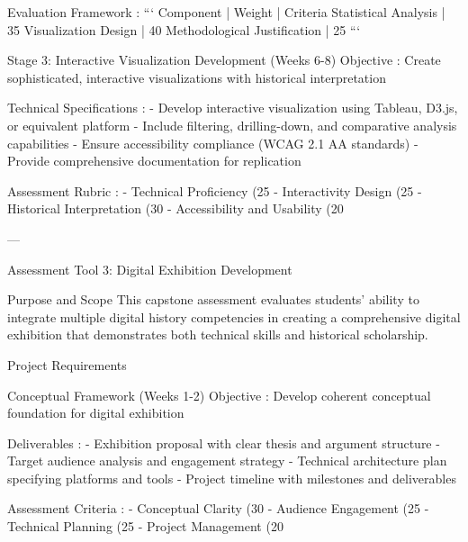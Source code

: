 \begin{appendices}
 Evaluation Framework :
```
Component | Weight | Criteria
Statistical Analysis | 35%
Visualization Design | 40%
Methodological Justification | 25%
```

     Stage 3: Interactive Visualization Development (Weeks 6-8)
 Objective : Create sophisticated, interactive visualizations with historical interpretation

 Technical Specifications :
- Develop interactive visualization using Tableau, D3.js, or equivalent platform
- Include filtering, drilling-down, and comparative analysis capabilities
- Ensure accessibility compliance (WCAG 2.1 AA standards)
- Provide comprehensive documentation for replication

 Assessment Rubric :
-  Technical Proficiency  (25%
-  Interactivity Design  (25%
-  Historical Interpretation  (30%
-  Accessibility and Usability  (20%

---

   Assessment Tool 3: Digital Exhibition Development

    Purpose and Scope
This capstone assessment evaluates students' ability to integrate multiple digital history competencies in creating a comprehensive digital exhibition that demonstrates both technical skills and historical scholarship.

    Project Requirements

     Conceptual Framework (Weeks 1-2)
 Objective : Develop coherent conceptual foundation for digital exhibition

 Deliverables :
- Exhibition proposal with clear thesis and argument structure
- Target audience analysis and engagement strategy
- Technical architecture plan specifying platforms and tools
- Project timeline with milestones and deliverables

 Assessment Criteria :
-  Conceptual Clarity  (30%
-  Audience Engagement  (25%
-  Technical Planning  (25%
-  Project Management  (20%


\end{appendices}
